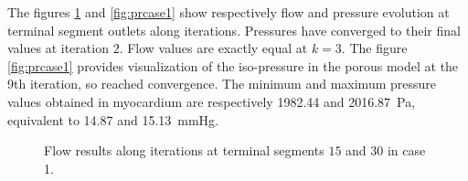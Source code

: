 \documentclass[a4paper, 11pt]{article} %
\begin{document}
The figures \ref{fig:flcase1} and \ref{fig:prcase1}\protect{} show respectively flow and pressure evolution at terminal segment outlets along iterations. Pressures have converged to their final values at iteration $2$. Flow values are exactly equal at $k=3$. 
The figure \ref{fig:prcase1}\protect{} provides visualization of the iso-pressure in the porous model at the 9th iteration, so reached convergence. The minimum and maximum pressure values obtained in myocardium are respectively \SI{1982.44}{} and \SI{2016.87}{Pa}, equivalent to \SI{14.87}{} and \SI{15.13}{\mmHg}. 

\begin{figure}[hbtp]
\begin{adjustwidth}{-2cm}{}
\begin{center}
\hspace{0.1cm}
\caption{Flow results along iterations at terminal segments $15$ and $30$ in case 1.}
\label{fig:flcase1}
\end{center}
\end{adjustwidth}
\end{figure}
\end{document}
